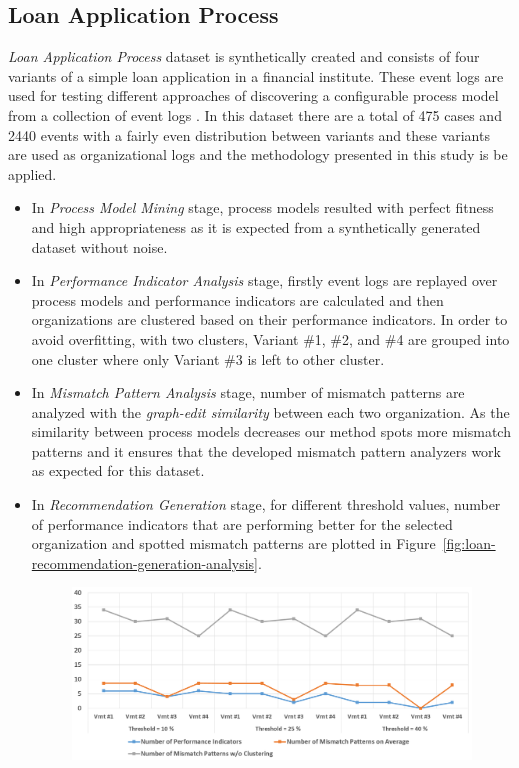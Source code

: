 \subsection{Loan Application Process}
\label{subsec:loan-app-process}
\textit{Loan Application Process} dataset is synthetically created and consists of four variants of a simple loan application in a financial institute. These event logs are used for testing different approaches of discovering a configurable process model from a collection of event logs \cite{buijs2014flexible}. In this dataset there are a total of 475 cases and 2440 events with a fairly even distribution between variants and these variants are used as organizational logs and the methodology presented in this study is be applied.

\begin{itemize}
  \item In \textit{Process Model Mining} stage, process models resulted with perfect fitness and high appropriateness as it is expected from a synthetically generated dataset without noise.
  \item In \textit{Performance Indicator Analysis} stage, firstly event logs are replayed over process models and performance indicators are calculated and then organizations are clustered based on their performance indicators. In order to avoid overfitting,  with two clusters, Variant \#1, \#2, and \#4 are grouped into one cluster where only Variant \#3 is left to other cluster. 
  \item In \textit{Mismatch Pattern Analysis} stage, number of mismatch patterns are analyzed with the \textit{graph-edit similarity} between each two organization. As the similarity between process models decreases our method spots more mismatch patterns and it ensures that the developed mismatch pattern analyzers work as expected for this dataset. 
  \item In \textit{Recommendation Generation} stage, for different threshold values, number of performance indicators that are performing better for the selected organization and spotted mismatch patterns are plotted in Figure~\ref{fig:loan-recommendation-generation-analysis}. 
    \begin{figure}
    	\centering
    	\includegraphics[width=\textwidth]{5_results_discussions/loan-application-process/recommendation-generation-analysis}

\end{figure}
\end{itemize}
